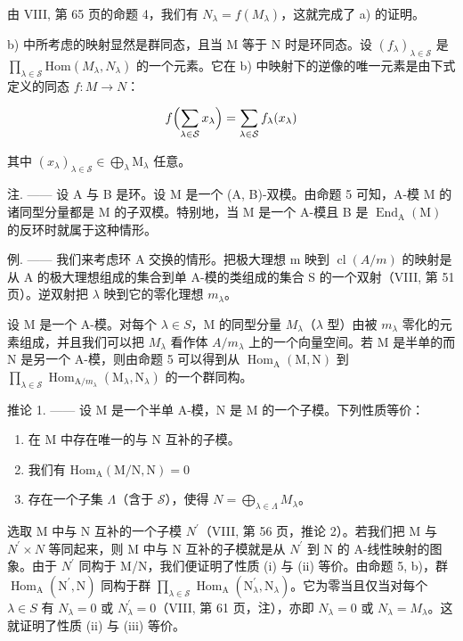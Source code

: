 由 VIII, 第 65 页的命题 4，我们有 \(N_{\lambda} = f(M_{\lambda})\)，这就完成了 a) 的证明。

b) 中所考虑的映射显然是群同态，且当 M 等于 N 时是环同态。设 \((f_{\lambda})_{\lambda \in \mathcal{S}}\) 是 \(\prod_{\lambda \in \mathcal{S}} \mathrm{Hom}(M_{\lambda}, N_{\lambda})\) 的一个元素。它在 b) 中映射下的逆像的唯一元素是由下式定义的同态 \(f : M \to N\)：

\[
f \Bigl (\sum_ {\lambda \in \mathcal {S}} x _ {\lambda} \Bigr) = \sum_ {\lambda \in \mathcal {S}} f _ {\lambda} (x _ {\lambda})
\]

其中 \((x_{\lambda})_{\lambda \in \mathcal{S}}\in \bigoplus_{\lambda}\mathrm{M}_{\lambda}\) 任意。

注. —— 设 A 与 B 是环。设 M 是一个 (A, B)-双模。由命题 5 可知，A-模 M 的诸同型分量都是 M 的子双模。特别地，当 M 是一个 A-模且 B 是 \(\operatorname{End}_{\mathrm{A}}(\mathrm{M})\) 的反环时就属于这种情形。

例. —— 我们来考虑环 A 交换的情形。把极大理想 m 映到 \(\operatorname{cl}(A/m)\) 的映射是从 A 的极大理想组成的集合到单 A-模的类组成的集合 S 的一个双射（VIII, 第 51 页）。逆双射把 \(\lambda\) 映到它的零化理想 \(m_{\lambda}\)。

设 M 是一个 A-模。对每个 \(\lambda\in S\)，M 的同型分量 \(M_{\lambda}\)（\(\lambda\) 型）由被 \(m_{\lambda}\) 零化的元素组成，并且我们可以把 \(M_{\lambda}\) 看作体 \(A/m_{\lambda}\) 上的一个向量空间。若 M 是半单的而 N 是另一个 A-模，则由命题 5 可以得到从 \(\operatorname{Hom}_{\mathrm{A}}(\mathrm{M},\mathrm{N})\) 到 \(\prod_{\lambda\in\mathcal{S}}\operatorname{Hom}_{\mathrm{A}/m_{\lambda}}(\mathrm{M}_{\lambda},\mathrm{N}_{\lambda})\) 的一个群同构。

推论 1. —— 设 M 是一个半单 A-模，N 是 M 的一个子模。下列性质等价：

\begin{enumerate}
\def\labelenumi{(\roman{enumi})}
\item
  在 M 中存在唯一的与 N 互补的子模。
\item
  我们有 \(\mathrm{Hom}_{\mathrm{A}}(\mathrm{M} / \mathrm{N},\mathrm{N}) = 0\)
\item
  存在一个子集 \(\Lambda\)（含于 \(\mathcal{S}\)），使得 \(N = \bigoplus_{\lambda \in \Lambda} M_{\lambda}\)。
\end{enumerate}

选取 M 中与 N 互补的一个子模 \(N^{\prime}\)（VIII, 第 56 页，推论 2）。若我们把 M 与 \(N^{\prime} \times N\) 等同起来，则 M 中与 N 互补的子模就是从 \(N^{\prime}\) 到 N 的 A-线性映射的图象。由于 \(N^{\prime}\) 同构于 M/N，我们便证明了性质 (i) 与 (ii) 等价。由命题 5, b)，群 \(\operatorname{Hom}_{\mathrm{A}}(\mathrm{N}^{\prime}, \mathrm{N})\) 同构于群 \(\prod_{\lambda \in \mathcal{S}} \operatorname{Hom}_{\mathrm{A}}(\mathrm{N}_{\lambda}^{\prime}, \mathrm{N}_{\lambda})\)。它为零当且仅当对每个 \(\lambda \in S\) 有 \(N_{\lambda} = 0\) 或 \(N_{\lambda}^{\prime} = 0\)（VIII, 第 61 页，注），亦即 \(N_{\lambda} = 0\) 或 \(N_{\lambda} = M_{\lambda}\)。这就证明了性质 (ii) 与 (iii) 等价。

